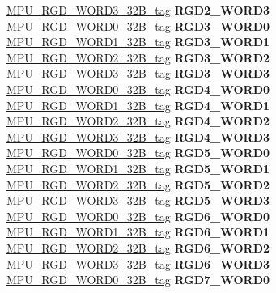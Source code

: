 \begin{DoxyCompactItemize}
\begin{tabbing}
\>\>\mbox{\hyperlink{unionMPU__RGD__WORD3__32B__tag}{MPU\_RGD\_WORD3\_32B\_tag}} {\bfseries RGD2\_WORD3}\\
\>\>\mbox{\hyperlink{unionMPU__RGD__WORD0__32B__tag}{MPU\_RGD\_WORD0\_32B\_tag}} {\bfseries RGD3\_WORD0}\\
\>\>\mbox{\hyperlink{unionMPU__RGD__WORD1__32B__tag}{MPU\_RGD\_WORD1\_32B\_tag}} {\bfseries RGD3\_WORD1}\\
\>\>\mbox{\hyperlink{unionMPU__RGD__WORD2__32B__tag}{MPU\_RGD\_WORD2\_32B\_tag}} {\bfseries RGD3\_WORD2}\\
\>\>\mbox{\hyperlink{unionMPU__RGD__WORD3__32B__tag}{MPU\_RGD\_WORD3\_32B\_tag}} {\bfseries RGD3\_WORD3}\\
\>\>\mbox{\hyperlink{unionMPU__RGD__WORD0__32B__tag}{MPU\_RGD\_WORD0\_32B\_tag}} {\bfseries RGD4\_WORD0}\\
\>\>\mbox{\hyperlink{unionMPU__RGD__WORD1__32B__tag}{MPU\_RGD\_WORD1\_32B\_tag}} {\bfseries RGD4\_WORD1}\\
\>\>\mbox{\hyperlink{unionMPU__RGD__WORD2__32B__tag}{MPU\_RGD\_WORD2\_32B\_tag}} {\bfseries RGD4\_WORD2}\\
\>\>\mbox{\hyperlink{unionMPU__RGD__WORD3__32B__tag}{MPU\_RGD\_WORD3\_32B\_tag}} {\bfseries RGD4\_WORD3}\\
\>\>\mbox{\hyperlink{unionMPU__RGD__WORD0__32B__tag}{MPU\_RGD\_WORD0\_32B\_tag}} {\bfseries RGD5\_WORD0}\\
\>\>\mbox{\hyperlink{unionMPU__RGD__WORD1__32B__tag}{MPU\_RGD\_WORD1\_32B\_tag}} {\bfseries RGD5\_WORD1}\\
\>\>\mbox{\hyperlink{unionMPU__RGD__WORD2__32B__tag}{MPU\_RGD\_WORD2\_32B\_tag}} {\bfseries RGD5\_WORD2}\\
\>\>\mbox{\hyperlink{unionMPU__RGD__WORD3__32B__tag}{MPU\_RGD\_WORD3\_32B\_tag}} {\bfseries RGD5\_WORD3}\\
\>\>\mbox{\hyperlink{unionMPU__RGD__WORD0__32B__tag}{MPU\_RGD\_WORD0\_32B\_tag}} {\bfseries RGD6\_WORD0}\\
\>\>\mbox{\hyperlink{unionMPU__RGD__WORD1__32B__tag}{MPU\_RGD\_WORD1\_32B\_tag}} {\bfseries RGD6\_WORD1}\\
\>\>\mbox{\hyperlink{unionMPU__RGD__WORD2__32B__tag}{MPU\_RGD\_WORD2\_32B\_tag}} {\bfseries RGD6\_WORD2}\\
\>\>\mbox{\hyperlink{unionMPU__RGD__WORD3__32B__tag}{MPU\_RGD\_WORD3\_32B\_tag}} {\bfseries RGD6\_WORD3}\\
\>\>\mbox{\hyperlink{unionMPU__RGD__WORD0__32B__tag}{MPU\_RGD\_WORD0\_32B\_tag}} {\bfseries RGD7\_WORD0}\\

\end{tabbing}
\end{DoxyCompactItemize}
